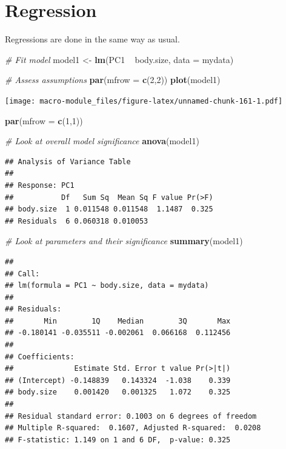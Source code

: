 \documentclass[]{book}
\newenvironment{Shaded}{\begin{snugshade}}{\end{snugshade}}
\newcommand{\KeywordTok}[1]{\textcolor[rgb]{0.13,0.29,0.53}{\textbf{{#1}}}}
\newcommand{\DataTypeTok}[1]{\textcolor[rgb]{0.13,0.29,0.53}{{#1}}}
\newcommand{\DecValTok}[1]{\textcolor[rgb]{0.00,0.00,0.81}{{#1}}}
\newcommand{\StringTok}[1]{\textcolor[rgb]{0.31,0.60,0.02}{{#1}}}
\newcommand{\CommentTok}[1]{\textcolor[rgb]{0.56,0.35,0.01}{\textit{{#1}}}}
\newcommand{\NormalTok}[1]{{#1}}
\begin{document}
\section{Regression}\label{regression}

Regressions are done in the same way as usual.

\begin{Shaded}
\begin{Highlighting}[]
\CommentTok{# Fit model}
\NormalTok{model1 <-}\StringTok{ }\KeywordTok{lm}\NormalTok{(PC1 ~}\StringTok{ }\NormalTok{body.size, }\DataTypeTok{data =} \NormalTok{mydata)}

\CommentTok{# Assess assumptions}
\KeywordTok{par}\NormalTok{(}\DataTypeTok{mfrow =} \KeywordTok{c}\NormalTok{(}\DecValTok{2}\NormalTok{,}\DecValTok{2}\NormalTok{))}
\KeywordTok{plot}\NormalTok{(model1)}
\end{Highlighting}
\end{Shaded}

\texttt{[image: macro-module\_files/figure-latex/unnamed-chunk-161-1.pdf]}

\begin{Shaded}
\begin{Highlighting}[]
\KeywordTok{par}\NormalTok{(}\DataTypeTok{mfrow =} \KeywordTok{c}\NormalTok{(}\DecValTok{1}\NormalTok{,}\DecValTok{1}\NormalTok{))}

\CommentTok{# Look at overall model significance}
\KeywordTok{anova}\NormalTok{(model1)}
\end{Highlighting}
\end{Shaded}

\begin{verbatim}
## Analysis of Variance Table
## 
## Response: PC1
##           Df   Sum Sq  Mean Sq F value Pr(>F)
## body.size  1 0.011548 0.011548  1.1487  0.325
## Residuals  6 0.060318 0.010053
\end{verbatim}

\begin{Shaded}
\begin{Highlighting}[]
\CommentTok{# Look at parameters and their significance}
\KeywordTok{summary}\NormalTok{(model1)}
\end{Highlighting}
\end{Shaded}

\begin{verbatim}
## 
## Call:
## lm(formula = PC1 ~ body.size, data = mydata)
## 
## Residuals:
##       Min        1Q    Median        3Q       Max 
## -0.180141 -0.035511 -0.002061  0.066168  0.112456 
## 
## Coefficients:
##              Estimate Std. Error t value Pr(>|t|)
## (Intercept) -0.148839   0.143324  -1.038    0.339
## body.size    0.001420   0.001325   1.072    0.325
## 
## Residual standard error: 0.1003 on 6 degrees of freedom
## Multiple R-squared:  0.1607, Adjusted R-squared:  0.0208 
## F-statistic: 1.149 on 1 and 6 DF,  p-value: 0.325
\end{verbatim}
\end{document}

